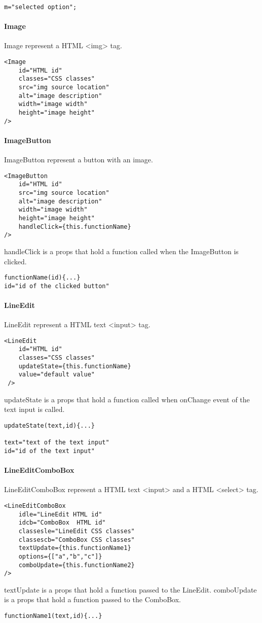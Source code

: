 \begin{flushleft}
\begin{verbatim}
m="selected option";
\end{verbatim}

    \paragraph{Image}
Image represent a HTML <img> tag.

\begin{verbatim}
<Image
    id="HTML id"
    classes="CSS classes"
    src="img source location"
    alt="image description"
    width="image width"
    height="image height"
/>
\end{verbatim}

    \paragraph{ImageButton}
ImageButton represent a button with an image.
\begin{verbatim}
<ImageButton
    id="HTML id"
    src="img source location"
    alt="image description"
    width="image width"
    height="image height"
    handleClick={this.functionName}
/>
\end{verbatim}
handleClick is a props that hold a function called when the ImageButton is clicked.
\begin{verbatim}
functionName(id){...}
id="id of the clicked button"
\end{verbatim}
    \paragraph{LineEdit}
LineEdit represent a HTML text <input> tag.
\begin{verbatim}
<LineEdit
    id="HTML id"
    classes="CSS classes"
    updateState={this.functionName}
    value="default value"
 />
\end{verbatim}
updateState is a props that hold a function called when onChange event of the text input is called.
\begin{verbatim}
updateState(text,id){...}

text="text of the text input"
id="id of the text input"
\end{verbatim}

    \paragraph{LineEditComboBox}
LineEditComboBox represent a HTML text <input> and a HTML <select> tag.
\begin{verbatim}
<LineEditComboBox
    idle="LineEdit HTML id"
    idcb="ComboBox  HTML id"
    classesle="LineEdit CSS classes"
    classescb="ComboBox CSS classes"
    textUpdate={this.functionName1}
    options={["a","b","c"]}
    comboUpdate={this.functionName2}
/>
\end{verbatim}
textUpdate is a props that hold a function passed to the LineEdit.
comboUpdate is a props that hold a function passed to the ComboBox.
\begin{verbatim}
functionName1(text,id){...}


\end{verbatim}
\end{flushleft}
